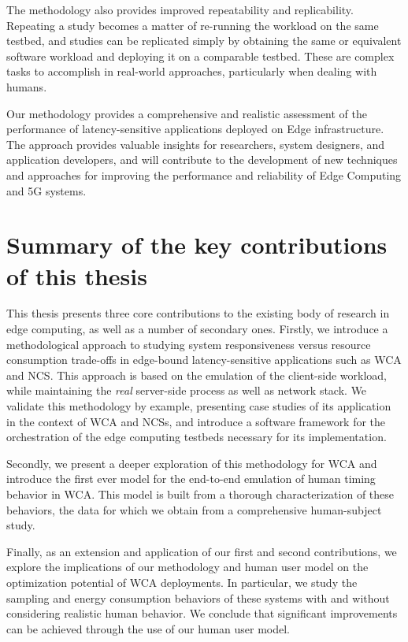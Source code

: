 The methodology also provides improved repeatability and replicability.
Repeating a study becomes a matter of re-running the workload on the same testbed, and studies can be replicated simply by obtaining the same or equivalent software workload and deploying it on a comparable testbed.
These are complex tasks to accomplish in real-world approaches, particularly when dealing with humans.

Our methodology provides a comprehensive and realistic assessment of the performance of latency-sensitive applications deployed on Edge infrastructure.
The approach provides valuable insights for researchers, system designers, and application developers, and will contribute to the development of new techniques and approaches for improving the performance and reliability of Edge Computing and 5G systems.

\section{Summary of the key contributions of this thesis}\label{sec:summary_contributions}

This thesis presents three core contributions to the existing body of research in edge computing, as well as a number of secondary ones.
Firstly, we introduce a methodological approach to studying system responsiveness versus resource consumption trade-offs in edge-bound latency-sensitive applications such as \gls{WCA} and \gls{NCS}.
This approach is based on the emulation of the client-side workload, while maintaining the \emph{real} server-side process as well as network stack.
We validate this methodology by example, presenting case studies of its application in the context of \gls{WCA} and \glspl{NCS}, and introduce a software framework for the orchestration of the edge computing testbeds necessary for its implementation.

Secondly, we present a deeper exploration of this methodology for \gls{WCA} and introduce the first ever model for the end-to-end emulation of human timing behavior in \gls{WCA}.
This model is built from a thorough characterization of these behaviors, the data for which we obtain from a comprehensive human-subject study.

Finally, as an extension and application of our first and second contributions, we explore the implications of our methodology and human user model on the optimization potential of \gls{WCA} deployments.
In particular, we study the sampling and energy consumption behaviors of these systems with and without considering realistic human behavior.
We conclude that significant improvements can be achieved through the use of our human user model.

